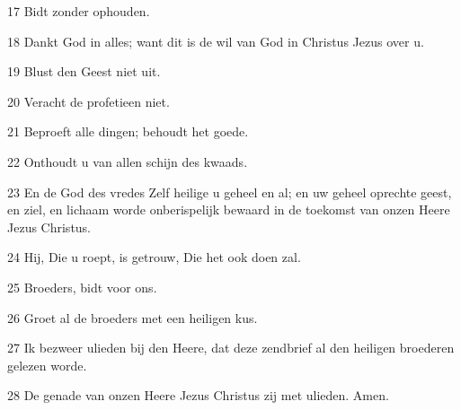 \par 17 Bidt zonder ophouden.
\par 18 Dankt God in alles; want dit is de wil van God in Christus Jezus over u.
\par 19 Blust den Geest niet uit.
\par 20 Veracht de profetieen niet.
\par 21 Beproeft alle dingen; behoudt het goede.
\par 22 Onthoudt u van allen schijn des kwaads.
\par 23 En de God des vredes Zelf heilige u geheel en al; en uw geheel oprechte geest, en ziel, en lichaam worde onberispelijk bewaard in de toekomst van onzen Heere Jezus Christus.
\par 24 Hij, Die u roept, is getrouw, Die het ook doen zal.
\par 25 Broeders, bidt voor ons.
\par 26 Groet al de broeders met een heiligen kus.
\par 27 Ik bezweer ulieden bij den Heere, dat deze zendbrief al den heiligen broederen gelezen worde.
\par 28 De genade van onzen Heere Jezus Christus zij met ulieden. Amen.



